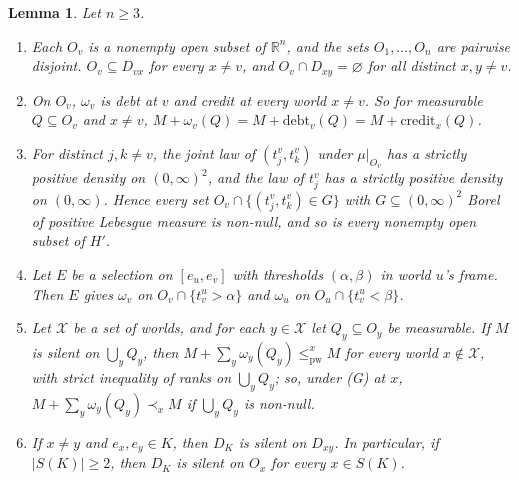 \documentclass[11pt]{article}
\newtheorem{lemma}[theorem]{Lemma}
\theoremstyle{definition}\newtheorem{definition}[theorem]{Definition}
\theoremstyle{remark}\newtheorem{remark}[theorem]{Remark}
\newcommand{\R}{\mathbb R}
\newcommand{\debt}{\mathrm{debt}}
\newcommand{\cred}{\mathrm{credit}}
\newcommand{\pw}{\mathrm{pw}}
\begin{document}
\begin{lemma}\label{lem:regions}
Let $n\ge3$.
\begin{enumerate}[label=(\alph*),leftmargin=*,itemsep=2pt]
\item Each $O_v$ is a nonempty open subset of $\R^n$, and the sets
$O_1,\dots,O_n$ are pairwise disjoint. $O_v\subseteq D_{vx}$ for every
$x\ne v$, and $O_v\cap D_{xy}=\varnothing$ for all distinct $x,y\ne v$.
\item On $O_v$, $\omega_v$ is debt at $v$ and credit at every world $x\ne
v$. So for measurable $Q\subseteq O_v$ and $x\ne v$,
$M+\omega_v(Q)=M+\debt_v(Q)=M+\cred_x(Q)$.
\item For distinct $j,k\ne v$, the joint law of $(t^v_j,t^v_k)$ under
$\mu|_{O_v}$ has a strictly positive density on $(0,\infty)^2$, and the law
of $t^v_j$ has a strictly positive density on $(0,\infty)$. Hence every
set $O_v\cap\{(t^v_j,t^v_k)\in G\}$ with $G\subseteq(0,\infty)^2$ Borel of
positive Lebesgue measure is non-null, and so is every nonempty open subset
of $H'$.
\item Let $E$ be a selection on $[e_u,e_v]$ with thresholds $(\alpha,\beta)$
in world $u$'s frame. Then $E$ gives $\omega_v$ on $O_v\cap\{t^u_v>\alpha\}$
and $\omega_u$ on $O_u\cap\{t^u_v<\beta\}$.
\item Let $\mathcal X$ be a set of worlds, and for each $y\in\mathcal X$
let $Q_y\subseteq O_y$ be measurable. If $M$ is silent on
$\bigcup_yQ_y$, then $M+\sum_y\omega_y(Q_y)\le^x_\pw M$ for every world
$x\notin\mathcal X$, with strict inequality of ranks on $\bigcup_yQ_y$; so,
under (G) at $x$, $M+\sum_y\omega_y(Q_y)\prec_xM$ if $\bigcup_yQ_y$ is
non-null.
\item If $x\ne y$ and $e_x,e_y\in K$, then $D_K$ is silent on $D_{xy}$. In
particular, if $|S(K)|\ge2$, then $D_K$ is silent on $O_x$ for every $x\in
S(K)$.
\end{enumerate}
\end{lemma}
\end{document}
